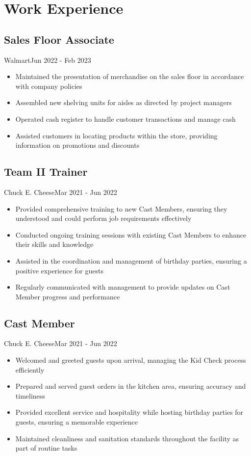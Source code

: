 \section{Work Experience}
\subsection{Sales Floor Associate}{Walmart}{Jun 2022 - Feb 2023}
\begin{itemize}
    \item Maintained the presentation of merchandise on the sales floor in accordance with company policies
    \item Assembled new shelving units for aisles as directed by project managers
    \item Operated cash register to handle customer transactions and manage cash
    \item Assisted customers in locating products within the store, providing information on promotions and discounts
\end{itemize}

\subsection{Team II Trainer}{Chuck E. Cheese}{Mar 2021 - Jun 2022}
\begin{itemize}
    \item Provided comprehensive training to new Cast Members, ensuring they understood and could perform job requirements effectively
    \item Conducted ongoing training sessions with existing Cast Members to enhance their skills and knowledge
    \item Assisted in the coordination and management of birthday parties, ensuring a positive experience for guests
    \item Regularly communicated with management to provide updates on Cast Member progress and performance
\end{itemize}

\subsection{Cast Member}{Chuck E. Cheese}{Mar 2021 - Jun 2022}
\begin{itemize}
    \item Welcomed and greeted guests upon arrival, managing the Kid Check process efficiently
    \item Prepared and served guest orders in the kitchen area, ensuring accuracy and timeliness
    \item Provided excellent service and hospitality while hosting birthday parties for guests, ensuring a memorable experience
    \item Maintained cleanliness and sanitation standards throughout the facility as part of routine tasks
\end{itemize}